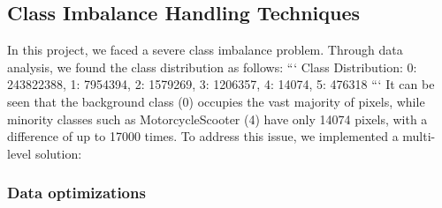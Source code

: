 \documentclass[conference]{IEEEtran}
\begin{document}
\subsection{Class Imbalance Handling Techniques}



In this project, we faced a severe class imbalance problem. Through data analysis, we found the class distribution as follows:
```
Class Distribution: {0: 243822388, 1: 7954394, 2: 1579269, 3: 1206357, 4: 14074, 5: 476318}
```
It can be seen that the background class (0) occupies the vast majority of pixels, while minority classes such as MotorcycleScooter (4) have only 14074 pixels, with a difference of up to 17000 times. To address this issue, we implemented a multi-level solution:


\subsubsection{Data optimizations}


            

\end{document}
